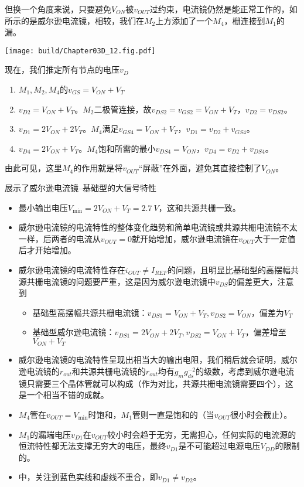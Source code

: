 但换一个角度来说，只要避免$V_{ON}$被$v_{OUT}$过约束，电流镜仍然是能正常工作的，如所示的是威尔逊电流镜，相较，我们在$M_2$上方添加了一个$M_4$，栅连接到$M_1$的漏。

\begin{Figure}
    \texttt{[image: build/Chapter03D\_12.fig.pdf]}
\end{Figure}

现在，我们推定所有节点的电压$v_D$
\begin{enumerate}
    \item $M_1,M_2,M_4$的$v_{GS}=V_{ON}+V_T$
    \item $v_{D2}=V_{ON}+V_T$。$M_2$二极管连接，故$v_{DS2}=v_{GS2}=V_{ON}+V_T$，$v_{D2}=v_{DS2}$。
    \item $v_{D1}=2V_{ON}+2V_T$。$M_4$满足$v_{GS4}=V_{ON}+V_T$，$v_{D1}=v_{D2}+v_{GS4}$。
    \item $v_{D4}=2V_{ON}+V_T$。$M_4$饱和所需的最小$v_{DS4}=V_{ON}$，$v_{D4}=v_{D2}+v_{DS4}$。
\end{enumerate}
由此可见，这里$M_4$的作用就是将$v_{OUT}$“屏蔽”在外面，避免其直接控制了$V_{ON}$。

展示了威尔逊电流镜--基础型的大信号特性
\begin{itemize}
    \item 最小输出电压$V_{\min}=2V_{ON}+V_T=\SI{2.7}{V}$，这和共源共栅一致。
    \item 威尔逊电流镜的电流特性的整体变化趋势和简单电流镜或共源共栅电流镜不太一样，后两者的电流从$v_{OUT}=0$就开始增加，威尔逊电流镜在$v_{OUT}$大于一定值后才开始增加。
    \item 威尔逊电流镜的电流特性存在$i_{OUT}\neq I_{REF}$的问题，且明显比基础型的高摆幅共源共栅电流镜的问题要严重，这是因为威尔逊电流镜中$v_{DS}$的偏差更大，注意到
    \begin{itemize}
        \item 基础型高摆幅共源共栅电流镜：$v_{DS1}=V_{ON}+V_T, v_{DS2}=V_{ON}$，偏差为$V_T$
        \item 基础型威尔逊电流镜：$v_{DS1}=2V_{ON}+2V_T, v_{DS2}=V_{ON}+V_T$，偏差增至$V_{ON}+V_T$ 
    \end{itemize}
    \item 威尔逊电流镜的电流特性呈现出相当大的输出电阻，我们稍后就会证明，威尔逊电流镜的$r_{out}$和共源共栅电流镜的$r_{out}$均有$g_mg_{ds}^{-2}$的级数，考虑到威尔逊电流镜只需要三个晶体管就可以构成（作为对比，共源共栅电流镜需要四个），这是一个相当不错的成就。
    \item $M_4$管在$v_{OUT}=V_{\min}$时饱和，$M_1$管则一直是饱和的（当$v_{OUT}$很小时会截止）。
    \item $M_1$的漏端电压$v_{D1}$在$v_{OUT}$较小时会趋于无穷，无需担心，任何实际的电流源的恒流特性都无法支撑无穷大的电压，最终$v_{D1}$是不可能超过电源电压$V_{DD}$的限制的。
    \item {}中，关注到蓝色实线和虚线不重合，即$v_{D1}\neq v_{D2}$。
\end{itemize}

